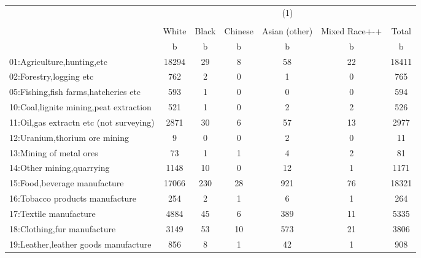 {
\def\sym#1{\ifmmode^{#1}\else\(^{#1}\)\fi}
\begin{tabular}{l*{6}{c}}
\hline\hline
            &\multicolumn{6}{c}{(1)}                                                      \\
            &\multicolumn{6}{c}{}                                                         \\
            &           White&           Black&           Chinese&           Asian (other)&           Mixed Race+-+&       Total\\
            &           b&           b&           b&           b&           b&           b\\
\hline
01:Agriculture,hunting,etc&       18294&          29&           8&          58&          22&       18411\\
02:Forestry,logging etc&         762&           2&           0&           1&           0&         765\\
05:Fishing,fish farms,hatcheries etc&         593&           1&           0&           0&           0&         594\\
10:Coal,lignite mining,peat extraction&         521&           1&           0&           2&           2&         526\\
11:Oil,gas extractn etc (not surveying)&        2871&          30&           6&          57&          13&        2977\\
12:Uranium,thorium ore mining&           9&           0&           0&           2&           0&          11\\
13:Mining of metal ores&          73&           1&           1&           4&           2&          81\\
14:Other mining,quarrying&        1148&          10&           0&          12&           1&        1171\\
15:Food,beverage manufacture&       17066&         230&          28&         921&          76&       18321\\
16:Tobacco products manufacture&         254&           2&           1&           6&           1&         264\\
17:Textile manufacture&        4884&          45&           6&         389&          11&        5335\\
18:Clothing,fur manufacture&        3149&          53&          10&         573&          21&        3806\\
19:Leather,leather goods manufacture&         856&           8&           1&          42&           1&         908\\

\end{tabular}}
